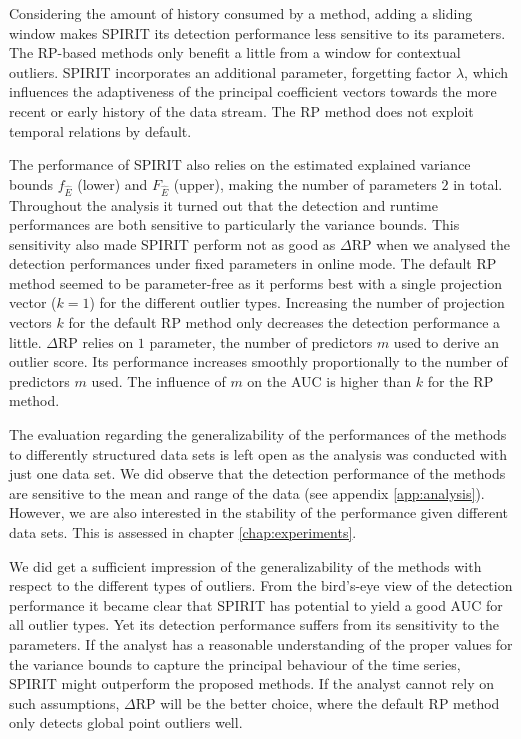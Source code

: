 Considering the amount of history consumed by a method, adding a sliding window makes SPIRIT its detection performance less sensitive to its parameters. The RP-based methods only benefit a little from a window for contextual outliers. SPIRIT incorporates an additional parameter, forgetting factor $\lambda$, which influences the adaptiveness of the principal coefficient vectors towards the more recent or early history of the data stream. The RP method does not exploit temporal relations by default.

The performance of SPIRIT also relies on the estimated explained variance bounds $f_{\hat{E}}$ (lower) and $F_{\hat{E}}$ (upper), making the number of parameters $2$ in total. Throughout the analysis it turned out that the detection and runtime performances are both sensitive to particularly the variance bounds. This sensitivity also made SPIRIT perform not as good as $\Delta$RP when we analysed the detection performances under fixed parameters in online mode. The default RP method seemed to be parameter-free as it performs best with a single projection vector ($k=1$) for the different outlier types. Increasing the number of projection vectors $k$ for the default RP method only decreases the detection performance a little. $\Delta$RP relies on $1$ parameter, the number of predictors $m$ used to derive an outlier score. Its performance increases smoothly proportionally to the number of predictors $m$ used. The influence of $m$ on the AUC is higher than $k$ for the RP method.

The evaluation regarding the generalizability of the performances of the methods to differently structured data sets is left open as the analysis was conducted with just one data set. We did observe that the detection performance of the methods are sensitive to the mean and range of the data (see appendix \ref{app:analysis}). However, we are also interested in the stability of the performance given different data sets. This is assessed in chapter \ref{chap:experiments}.

We did get a sufficient impression of the generalizability of the methods with respect to the different types of outliers. From the bird's-eye view of the detection performance it became clear that SPIRIT has potential to yield a good AUC for all outlier types. Yet its detection performance suffers from its sensitivity to the parameters. If the analyst has a reasonable understanding of the proper values for the variance bounds to capture the principal behaviour of the time series, SPIRIT might outperform the proposed methods. If the analyst cannot rely on such assumptions, $\Delta$RP will be the better choice, where the default RP method only detects global point outliers well.

